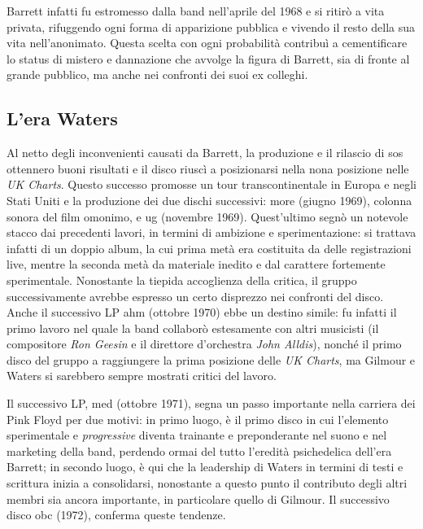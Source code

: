 \documentclass[class=book, crop=false, oneside, 12pt]{standalone}
\begin{document}
    Barrett infatti fu estromesso dalla band nell'aprile del 1968 e si ritirò a vita privata, rifuggendo ogni forma di apparizione pubblica e vivendo il resto della sua vita nell'anonimato. Questa scelta con ogni probabilità contribuì a cementificare lo status di mistero e dannazione che avvolge la figura di Barrett, sia di fronte al grande pubblico, ma anche nei confronti dei suoi ex colleghi.
    
    
    \subsection{L'era Waters}
    Al netto degli inconvenienti causati da Barrett, la produzione e il rilascio di \acrshort{sos} ottennero buoni risultati e il disco riuscì a posizionarsi nella nona posizione nelle \emph{UK Charts}. Questo successo promosse un tour transcontinentale in Europa e negli Stati Uniti e la produzione dei due dischi successivi: \acrlong{more} (giugno 1969), colonna sonora del film omonimo, e \acrlong{ug} (novembre 1969). Quest'ultimo segnò un notevole stacco dai precedenti lavori, in termini di ambizione e sperimentazione: si trattava infatti di un doppio album, la cui prima metà era costituita da delle registrazioni live, mentre la seconda metà da materiale inedito e dal carattere fortemente sperimentale. Nonostante la tiepida accoglienza della critica, il gruppo successivamente avrebbe espresso un certo disprezzo nei confronti del disco. Anche il successivo LP  \acrfull{ahm} (ottobre 1970) ebbe un destino simile: fu infatti il primo lavoro nel quale la band collaborò estesamente con altri musicisti (il compositore \emph{Ron Geesin} e il direttore d'orchestra \emph{John Alldis}), nonché il primo disco del gruppo a raggiungere la prima posizione delle \emph{UK Charts}, ma Gilmour e Waters si sarebbero sempre mostrati critici del lavoro.


    Il successivo LP, \acrlong{med} (ottobre 1971), segna un passo importante nella carriera dei Pink Floyd per due motivi: in primo luogo, è il primo disco in cui l'elemento sperimentale e \emph{progressive} diventa trainante e preponderante nel suono e nel marketing della band, perdendo ormai del tutto l'eredità psichedelica dell'era Barrett; in secondo luogo, è qui che la leadership di Waters in termini di testi e scrittura inizia a consolidarsi, nonostante a questo punto il contributo degli altri membri sia ancora importante, in particolare quello di Gilmour. Il successivo disco \acrfull{obc} (1972), conferma queste tendenze.
\end{document}
